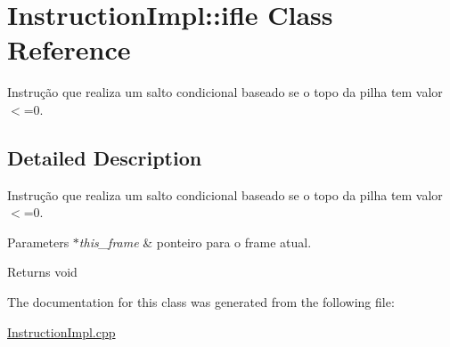 \hypertarget{class_instruction_impl_1_1ifle}{}\section{Instruction\+Impl\+:\+:ifle Class Reference}
\label{class_instruction_impl_1_1ifle}


Instrução que realiza um salto condicional baseado se o topo da pilha tem valor $<$=0.  




\subsection{Detailed Description}
Instrução que realiza um salto condicional baseado se o topo da pilha tem valor $<$=0. 


\begin{DoxyParams}{Parameters}
{\em $\ast$this\+\_\+frame} & ponteiro para o frame atual. \\
\hline
\end{DoxyParams}
\begin{DoxyReturn}{Returns}
void 
\end{DoxyReturn}


The documentation for this class was generated from the following file\+:\begin{DoxyCompactItemize}
\item 
\hyperlink{_instruction_impl_8cpp}{Instruction\+Impl.\+cpp}\end{DoxyCompactItemize}
